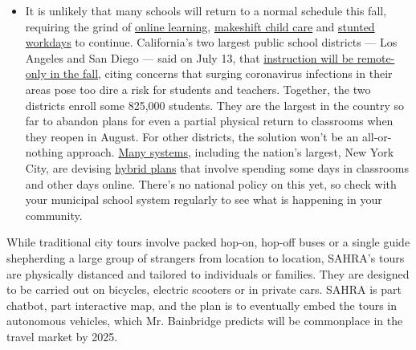 \begin{itemize}
  \begin{itemize}
  \tightlist
  \item
    It is unlikely that many schools will return to a normal schedule
    this fall, requiring the grind of
    \href{https://www.nytimes.com/2020/06/05/us/coronavirus-education-lost-learning.html?action=click\&pgtype=Article\&state=default\&region=MAIN_CONTENT_3\&context=storylines_faq}{online
    learning},
    \href{https://www.nytimes.com/2020/05/29/us/coronavirus-child-care-centers.html?action=click\&pgtype=Article\&state=default\&region=MAIN_CONTENT_3\&context=storylines_faq}{makeshift
    child care} and
    \href{https://www.nytimes.com/2020/06/03/business/economy/coronavirus-working-women.html?action=click\&pgtype=Article\&state=default\&region=MAIN_CONTENT_3\&context=storylines_faq}{stunted
    workdays} to continue. California's two largest public school
    districts --- Los Angeles and San Diego --- said on July 13, that
    \href{https://www.nytimes.com/2020/07/13/us/lausd-san-diego-school-reopening.html?action=click\&pgtype=Article\&state=default\&region=MAIN_CONTENT_3\&context=storylines_faq}{instruction
    will be remote-only in the fall}, citing concerns that surging
    coronavirus infections in their areas pose too dire a risk for
    students and teachers. Together, the two districts enroll some
    825,000 students. They are the largest in the country so far to
    abandon plans for even a partial physical return to classrooms when
    they reopen in August. For other districts, the solution won't be an
    all-or-nothing approach.
    \href{https://bioethics.jhu.edu/research-and-outreach/projects/eschool-initiative/school-policy-tracker/}{Many
    systems}, including the nation's largest, New York City, are
    devising
    \href{https://www.nytimes.com/2020/06/26/us/coronavirus-schools-reopen-fall.html?action=click\&pgtype=Article\&state=default\&region=MAIN_CONTENT_3\&context=storylines_faq}{hybrid
    plans} that involve spending some days in classrooms and other days
    online. There's no national policy on this yet, so check with your
    municipal school system regularly to see what is happening in your
    community.
  \end{itemize}
\end{itemize}

While traditional city tours involve packed hop-on, hop-off buses or a
single guide shepherding a large group of strangers from location to
location, SAHRA's tours are physically distanced and tailored to
individuals or families. They are designed to be carried out on
bicycles, electric scooters or in private cars. SAHRA is part chatbot,
part interactive map, and the plan is to eventually embed the tours in
autonomous vehicles, which Mr. Bainbridge predicts will be commonplace
in the travel market by 2025.


